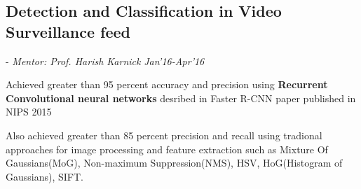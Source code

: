 \documentclass[a4paper]{twentysecondcv} %
\begin{document}

\subsection{\textbf{Detection and Classification in Video Surveillance feed}}
\vspace{-2mm}
\hspace{1mm}- \textit{Mentor: Prof. Harish Karnick} \hfill \emph{Jan'16-Apr'16}
\vspace{1mm}
\begin{list3} 
\item Achieved greater than 95 percent accuracy and precision  using
  \textbf{Recurrent Convolutional neural networks} desribed in Faster R-CNN paper published in
  NIPS 2015
\item Also achieved greater than 85 percent precision and recall using tradional
  approaches for image processing and
  feature extraction such as Mixture Of Gaussians(MoG), Non-maximum Suppression(NMS), HSV,
  HoG(Histogram of Gaussians), SIFT.
  \newline
  \newline
\end{list3}
\vspace{2mm}
\end{document}
